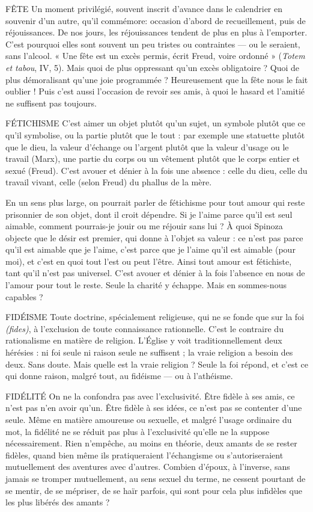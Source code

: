 FÊTE Un moment privilégié, souvent inscrit d’avance dans le calendrier en
souvenir d’un autre, qu’il commémore: occasion d’abord de
recueillement, puis de réjouissances. De nos jours, les réjouissances tendent de
plus en plus à l’emporter. C’est pourquoi elles sont souvent un peu tristes ou
contraintes — ou le seraient, sans l'alcool. « Une fête est un excès permis, écrit
Freud, voire ordonné » ({\it Totem et tabou}, IV, 5). Mais quoi de plus oppressant
qu’un excès obligatoire ? Quoi de plus démoralisant qu’une joie programmée ?
Heureusement que la fête nous le fait oublier ! Puis c’est aussi l’occasion de
revoir ses amis, à quoi le hasard et l’amitié ne suffisent pas toujours.

FÉTICHISME C’est aimer un objet plutôt qu’un sujet, un symbole plutôt
que ce qu’il symbolise, ou la partie plutôt que le tout : par
exemple une statuette plutôt que le dieu, la valeur d'échange ou l'argent plutôt
que la valeur d’usage ou le travail (Marx), une partie du corps ou un vêtement
plutôt que le corps entier et sexué (Freud). C’est avouer et dénier à la fois une
absence : celle du dieu, celle du travail vivant, celle (selon Freud) du phallus de
la mère.

En un sens plus large, on pourrait parler de fétichisme pour tout amour qui
reste prisonnier de son objet, dont il croit dépendre. Si je l'aime parce qu'il est
seul aimable, comment pourrais-je jouir ou me réjouir sans lui ? À quoi Spinoza
objecte que le désir est premier, qui donne à l’objet sa valeur : ce n’est pas
parce qu’il est aimable que je l’aime, c’est parce que je l’aime qu’il est aimable
(pour moi), et c’est en quoi tout l’est ou peut l’être. Ainsi tout amour est fétichiste,
tant qu’il n’est pas universel. C’est avouer et dénier à la fois l’absence en
nous de l’amour pour tout le reste. Seule la charité y échappe. Mais en sommes-nous
capables ?

FIDÉISME Toute doctrine, spécialement religieuse, qui ne se fonde que sur
la foi {\it (fides)}, à l'exclusion de toute connaissance rationnelle.
C’est le contraire du rationalisme en matière de religion. L'Église y voit traditionnellement
deux hérésies : ni foi seule ni raison seule ne suffisent ; la vraie
religion a besoin des deux. Sans doute. Mais quelle est la vraie religion ? Seule
la foi répond, et c’est ce qui donne raison, malgré tout, au fidéisme — ou à
l’athéisme.

FIDÉLITÉ On ne la confondra pas avec l'exclusivité. Être fidèle à ses amis,
ce n’est pas n’en avoir qu’un. Être fidèle à ses idées, ce n’est pas
se contenter d’une seule. Même en matière amoureuse ou sexuelle, et malgré
l'usage ordinaire du mot, la fidélité ne se réduit pas plus à l'exclusivité qu’elle
ne la suppose nécessairement. Rien n'empêche, au moins en théorie, deux
amants de se rester fidèles, quand bien même ils pratiqueraient l’échangisme ou
s’autoriseraient mutuellement des aventures avec d’autres. Combien d’époux, à
l'inverse, sans jamais se tromper mutuellement, au sens sexuel du terme, ne cessent
pourtant de se mentir, de se mépriser, de se haïr parfois, qui sont pour cela
plus infidèles que les plus libérés des amants ?

